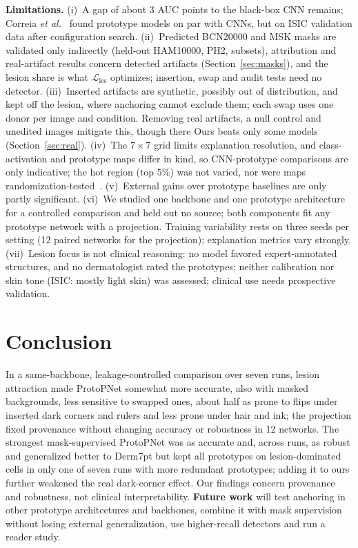 \documentclass[conference]{IEEEtran}
\newcommand{\Lles}{\mathcal{L}_{\mathrm{les}}}
\begin{document}
\textbf{Limitations.} (i)~A gap of about 3 AUC points to the black-box CNN remains; Correia \emph{et al.}~\cite{correia2023} found prototype models on par with CNNs, but on ISIC validation data after configuration search. (ii)~Predicted BCN20000 and MSK masks are validated only indirectly (held-out HAM10000, PH2, subsets), attribution and real-artifact results concern detected artifacts (Section~\ref{sec:masks}), and the lesion share is what $\Lles$ optimizes; insertion, swap and audit tests need no detector. (iii)~Inserted artifacts are synthetic, possibly out of distribution, and kept off the lesion, where anchoring cannot exclude them; each swap uses one donor per image and condition. Removing real artifacts, a null control and unedited images mitigate this, though there Ours beats only some models (Section~\ref{sec:real}). (iv)~The $7\times7$ grid limits explanation resolution, and class-activation and prototype maps differ in kind, so CNN-prototype comparisons are only indicative; the hot region (top 5\%) was not varied, nor were maps randomization-tested~\cite{adebayo2018}. (v)~External gains over prototype baselines are only partly significant. (vi)~We studied one backbone and one prototype architecture for a controlled comparison and held out no source; both components fit any prototype network with a projection. Training variability rests on three seeds per setting (12 paired networks for the projection); explanation metrics vary strongly. (vii)~Lesion focus is not clinical reasoning: no model favored expert-annotated structures, and no dermatologist rated the prototypes; neither calibration nor skin tone (ISIC: mostly light skin) was assessed; clinical use needs prospective validation.
\section{Conclusion}
In a same-backbone, leakage-controlled comparison over seven runs, lesion attraction made ProtoPNet somewhat more accurate, also with masked backgrounds, less sensitive to swapped ones, about half as prone to flips under inserted dark corners and rulers and less prone under hair and ink; the projection fixed provenance without changing accuracy or robustness in 12 networks. The strongest mask-supervised ProtoPNet was as accurate and, across runs, as robust and generalized better to Derm7pt but kept all prototypes on lesion-dominated cells in only one of seven runs with more redundant prototypes; adding it to ours further weakened the real dark-corner effect. Our findings concern provenance and robustness, not clinical interpretability. \textbf{Future work} will test anchoring in other prototype architectures and backbones, combine it with mask supervision without losing external generalization, use higher-recall detectors and run a reader study.
\end{document}
